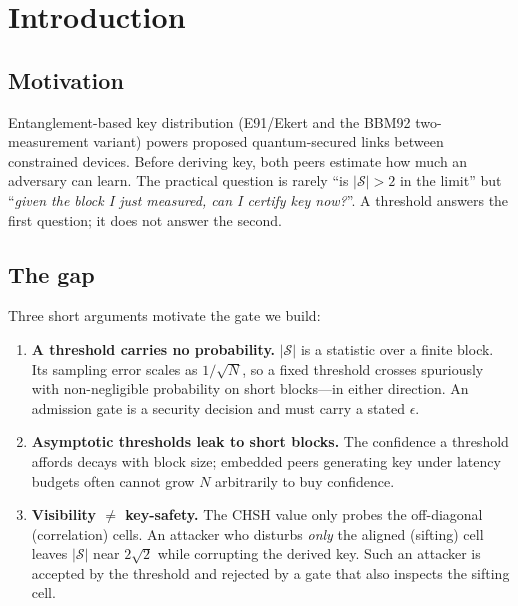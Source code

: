 \documentclass[11pt,a4paper]{article}
\newcommand{\CHSH}{\mathcal{S}}
\newcommand{\eps}{\epsilon}
\newcommand{\bell}{2\sqrt{2}}
\theoremstyle{plain}
\theoremstyle{definition}
\begin{document}
\section{Introduction}
\subsection{Motivation}
Entanglement-based key distribution (E91/Ekert \citep{ekert1991} and the BBM92
two-measurement variant) powers proposed quantum-secured links between
constrained devices. Before deriving key, both peers estimate how much an
adversary can learn. The practical question is rarely ``is $|\CHSH|>2$ in the
limit'' but ``\emph{given the block I just measured, can I certify key now?}''.
A threshold answers the first question; it does not answer the second.

\subsection{The gap}
Three short arguments motivate the gate we build:

\begin{enumerate}
  \item \textbf{A threshold carries no probability.} $|\CHSH|$ is a statistic
    over a finite block. Its sampling error scales as $1/\sqrt{N}$, so a fixed
    threshold crosses spuriously with non-negligible probability on short
    blocks---in either direction. An admission gate is a security decision and
    must carry a stated $\eps$.

  \item \textbf{Asymptotic thresholds leak to short blocks.} The confidence a
    threshold affords decays with block size; embedded peers generating key
    under latency budgets often cannot grow $N$ arbitrarily to buy confidence.

  \item \textbf{Visibility $\ne$ key-safety.} The CHSH value only probes the
    off-diagonal (correlation) cells. An attacker who disturbs \emph{only} the
    aligned (sifting) cell leaves $|\CHSH|$ near $\bell$ while corrupting the
    derived key. Such an attacker is accepted by the threshold and rejected by
    a gate that also inspects the sifting cell.
\end{enumerate}
\end{document}
